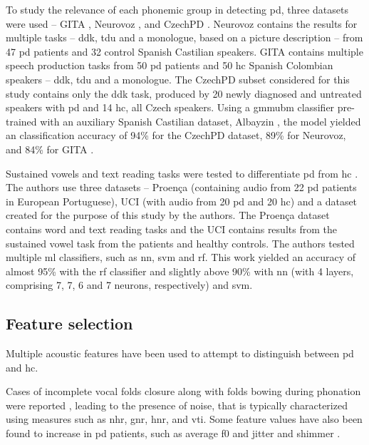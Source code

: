 To study the relevance of each phonemic group in detecting \gls{pd}, three datasets were used -- GITA \cite{GITA}, Neurovoz \cite{Neurovoz}, and CzechPD \cite{CzechPD}. Neurovoz contains the results for multiple tasks -- \gls{ddk}, \gls{tdu} and a monologue, based on a picture description -- from 47 \gls{pd} patients and 32 control Spanish Castilian speakers. GITA contains multiple speech production tasks from 50 \gls{pd} patients and 50 \gls{hc} Spanish Colombian speakers -- \gls{ddk}, \gls{tdu} and a monologue. The CzechPD subset considered for this study contains only the \gls{ddk} task, produced by 20 newly diagnosed and untreated speakers with \gls{pd} and 14 \gls{hc}, all Czech speakers. Using a \gls{gmmubm} classifier pre-trained with an auxiliary Spanish Castilian dataset, Albayzin \cite{Albayzin}, the model yielded an classification accuracy of 94\% for the CzechPD dataset, 89\% for Neurovoz, and 84\% for GITA \cite{parkinson_phonemic_relevance}. 

Sustained vowels and text reading tasks were tested to differentiate \gls{pd} from \gls{hc} \cite{parkinson_braga}. The authors use three datasets -- Proença \cite{Proenca} (containing audio from 22 \gls{pd} patients in European Portuguese), UCI \cite{UCI} (with audio from 20 \gls{pd} and 20 \gls{hc}) and a dataset created for the purpose of this study by the authors. The Proença dataset contains word and text reading tasks and the UCI contains results from the sustained vowel task from the patients and healthy controls. The authors tested multiple \gls{ml} classifiers, such as \gls{nn}, \gls{svm} and \gls{rf}. This work yielded an accuracy of almost 95\% with the \gls{rf} classifier and slightly above 90\% with \gls{nn} (with 4 layers, comprising 7, 7, 6 and 7 neurons, respectively) and \gls{svm}.

\subsection{Feature selection}

Multiple acoustic features have been used to attempt to distinguish between \gls{pd} and \gls{hc}.

Cases of incomplete vocal folds closure along with folds bowing during phonation were reported \cite{features_explained}, leading to the presence of noise, that is typically characterized using measures such as \gls{nhr}, \gls{gnr}, \gls{hnr}, and \gls{vti}. Some feature values have also been found to increase in \gls{pd} patients, such as average \gls{f0} and jitter \cite{f0_jitter} and shimmer \cite{shimmer}.

